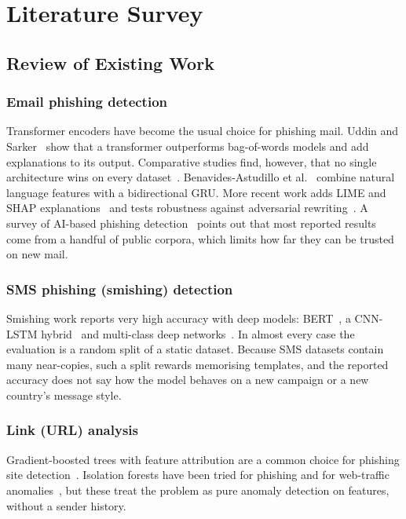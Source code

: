 \chapter{Literature Survey}\thispagestyle{thesisstyle} %
\graphicspath{{Chapter2/figures/}}
{ 

\section{Review of Existing Work}

\subsection{Email phishing detection}
Transformer encoders have become the usual choice for phishing mail. Uddin and Sarker~\cite{uddin2024explainable} show that a transformer outperforms bag-of-words models and add explanations to its output. Comparative studies find, however, that no single architecture wins on every dataset~\cite{altwaijry2024advancing,alhuzali2025indepth}. Benavides-Astudillo et al.~\cite{benavides2023phishing} combine natural language features with a bidirectional GRU. More recent work adds LIME and SHAP explanations~\cite{roshinta2026temporal,calzarossa2024explainable} and tests robustness against adversarial rewriting~\cite{sup2025explainable,kulkarni2024ml2llm}. A survey of AI-based phishing detection~\cite{ahmad2025spectrum} points out that most reported results come from a handful of public corpora, which limits how far they can be trusted on new mail.

\subsection{SMS phishing (smishing) detection}
Smishing work reports very high accuracy with deep models: BERT~\cite{jain2025smishing}, a CNN-LSTM hybrid~\cite{mehmood2024smishing} and multi-class deep networks~\cite{boulahaia2025multiclass}. In almost every case the evaluation is a random split of a static dataset. Because SMS datasets contain many near-copies, such a split rewards memorising templates, and the reported accuracy does not say how the model behaves on a new campaign or a new country's message style.

\subsection{Link (URL) analysis}
Gradient-boosted trees with feature attribution are a common choice for phishing site detection~\cite{uddin2025boosting}. Isolation forests have been tried for phishing and for web-traffic anomalies~\cite{lestari2025isolation,chua2024isolation}, but these treat the problem as pure anomaly detection on features, without a sender history.

}
